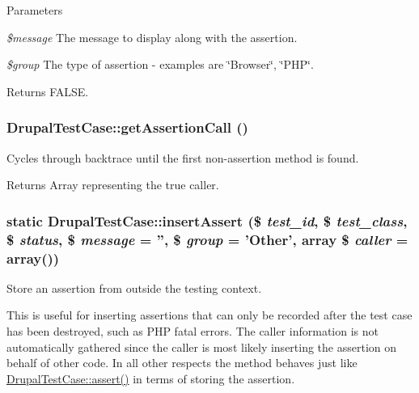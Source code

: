 \begin{DoxyParams}{Parameters}
\item[{\em \$message}]The message to display along with the assertion. \item[{\em \$group}]The type of assertion -\/ examples are \char`\"{}Browser\char`\"{}, \char`\"{}PHP\char`\"{}. \end{DoxyParams}
\begin{DoxyReturn}{Returns}
FALSE. 
\end{DoxyReturn}
\hypertarget{class_drupal_test_case_a6129193cb03df38244d6149bf88b7c0c}{
\subsubsection[{getAssertionCall}]{\setlength{\rightskip}{0pt plus 5cm}DrupalTestCase::getAssertionCall ()}}
\label{class_drupal_test_case_a6129193cb03df38244d6149bf88b7c0c}
Cycles through backtrace until the first non-\/assertion method is found.

\begin{DoxyReturn}{Returns}
Array representing the true caller. 
\end{DoxyReturn}
\hypertarget{class_drupal_test_case_add756d567d09f64668d57eb02be5b9fe}{
\subsubsection[{insertAssert}]{\setlength{\rightskip}{0pt plus 5cm}static DrupalTestCase::insertAssert (\$ {\em test\_\-id}, \/  \$ {\em test\_\-class}, \/  \$ {\em status}, \/  \$ {\em message} = {\ttfamily ''}, \/  \$ {\em group} = {\ttfamily 'Other'}, \/  array \$ {\em caller} = {\ttfamily array()})}}
\label{class_drupal_test_case_add756d567d09f64668d57eb02be5b9fe}
Store an assertion from outside the testing context.

This is useful for inserting assertions that can only be recorded after the test case has been destroyed, such as PHP fatal errors. The caller information is not automatically gathered since the caller is most likely inserting the assertion on behalf of other code. In all other respects the method behaves just like \hyperlink{class_drupal_test_case_ae4722b337aa79fcd753a2fc0c2f0b179}{DrupalTestCase::assert()} in terms of storing the assertion.

